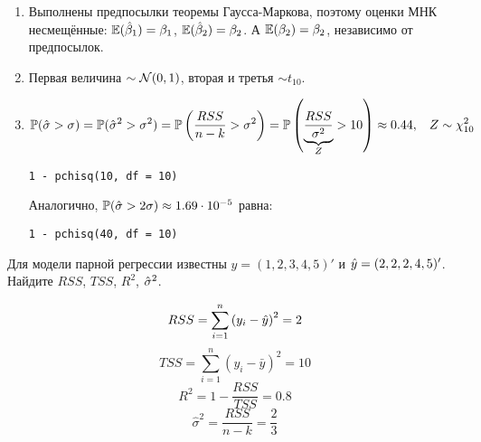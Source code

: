 \begin{problem}
\begin{sol}
\begin{enumerate}
\item Выполнены предпосылки теоремы Гаусса-Маркова, поэтому оценки МНК несмещённые: $\E(\hb_1) = \beta_1$, $\E(\hb_2) = \beta_2$. А $\E(\beta_2) = \beta_2$, независимо от предпосылок.

\item Первая величина $\sim \cN(0, 1)$, вторая и третья $\sim t_{10}$.
\item
\[\P(\hat{\sigma} > \sigma) = \P(\hat{\sigma}^2 > \sigma^2) = \P\left(\frac{RSS}{n-k}>\sigma^2\right) = \P\left( \underbrace{\frac{RSS}{\sigma^2}}_{Z} > 10\right) \approx 0.44, \hspace{3mm} Z \sim \chi^2_{10}
\]

\begin{verbatim}
1 - pchisq(10, df = 10)
\end{verbatim}

Аналогично, $\P(\hat{\sigma} > 2\sigma) \approx 1.69 \cdot 10^{-5}$ равна:
\begin{verbatim}
1 - pchisq(40, df = 10)
\end{verbatim}

\end{enumerate}
\end{sol}
\end{problem}




\begin{problem}
Для модели парной регрессии известны $y=(1, 2, 3, 4, 5)'$ и $\hy=(2, 2, 2, 4, 5)'$. Найдите $RSS$, $TSS$, $R^2$, $\hs^2$.


\begin{sol}
\[ RSS = \sum_{i = 1}^n \left(y_i - \hy \right)^2 = 2   \]
\[  TSS = \sum_{i = 1}^n \left(y_i - \bar{y} \right)^2 =  10   \]
\[  R^2 = 1 - \frac{RSS}{TSS} = 0.8  \]
\[  \hat{\sigma}^2 = \frac{RSS}{n - k} = \frac{2}{3}   \]
\end{sol}
\end{problem}



